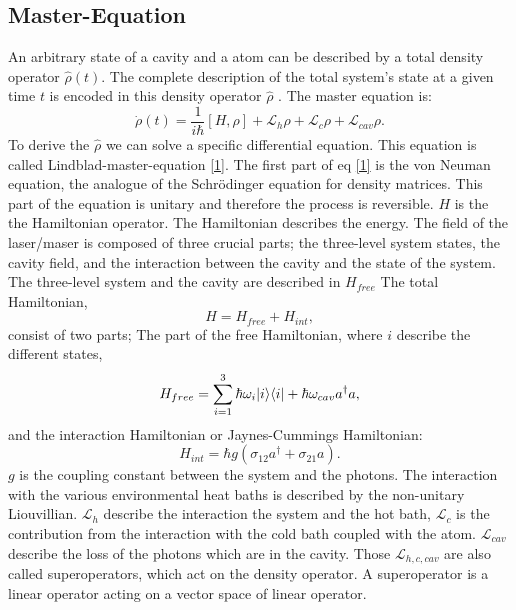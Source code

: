 \documentclass[12pt,a4paper]{article}
\DeclarePairedDelimiter\bra{\langle}{\rvert}
\DeclarePairedDelimiter\ket{\lvert}{\rangle}
\begin{document}
\subsection{Master-Equation} 
An arbitrary state of a cavity and a atom can be described by a total density operator $\hat{\rho}(t)$. %
The complete description of the total system's state at a given time $t$ is encoded in this density 
operator $\hat{\rho}$ \cite{Li2017}.
The master equation is:
\begin{equation}
\dot{\rho}(t)=\frac{1}{i \hbar}[H,\rho]+ \mathcal{L}_{h}\rho+ \mathcal{L}_{c}\rho+ \mathcal{L}_{cav}\rho. \label{1}
\end{equation}
To derive the $\hat{\rho}$ we can solve a specific differential equation. This equation is called Lindblad-master-equation \eqref{1}. 
The first part of eq \eqref{1} is the von Neuman equation,  the analogue of the Schrödinger equation for density matrices. This part of the equation is unitary and therefore the process is reversible.
$H$ is the the Hamiltonian operator. 
The Hamiltonian describes the energy. 
The field of the laser/maser is composed of three crucial 
parts; the three-level system states, the cavity field, and the interaction between the cavity and the state of the system.
The three-level system and  the  cavity are described in $H_{free}$
The total Hamiltonian,
\begin{equation}
H=H_{free}+H_{int},
\end{equation}
consist of two parts; The part of the free Hamiltonian, where $i$ describe the different states,
\begin{equation}
H_{free}=\sum_{i=1}^3 \hbar \omega_i \ket{i}\bra{i}+\hbar \omega_{cav} a^{\dag}a,\label{2}
\end{equation}
and the interaction Hamiltonian or Jaynes-Cummings Hamiltonian:
\begin{equation}
H_{int}=\hbar g(\sigma_{12}a^{\dag}+\sigma_{21}a).\label{3}
\end{equation}
$g$ is the coupling constant between the system and the photons.  
\newpage
The interaction with the various environmental heat baths is described by the non-unitary Liouvillian. $\mathcal{L}_h$ describe the interaction the system and the hot bath, $\mathcal{L}_c$ is the contribution from the interaction with the cold bath coupled with the atom.  $\mathcal{L}_{cav}$ describe the loss of the photons which are in the cavity.  Those $\mathcal{L}_{h,c,cav}$ are also called superoperators, which act on the density operator.  A superoperator is a linear operator acting on a vector space of linear operator. 
\end{document}
